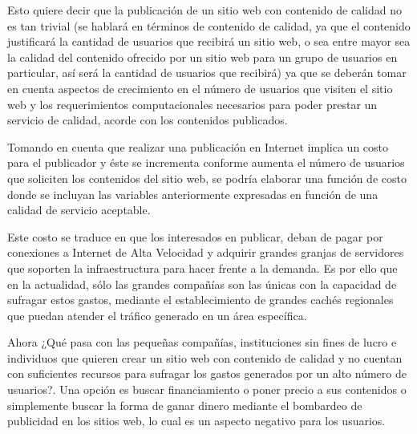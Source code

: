 Esto quiere decir que la publicación de un sitio web con contenido de calidad no es tan trivial (se hablará en términos de contenido de calidad, ya que el contenido justificará la cantidad de usuarios que recibirá un sitio web, o sea entre mayor sea la calidad del contenido ofrecido por un sitio web para un grupo de usuarios en particular, así será la cantidad de usuarios que recibirá) ya que se deberán tomar en cuenta aspectos de crecimiento en el número de usuarios que visiten el sitio web y los requerimientos computacionales necesarios para poder prestar un servicio de calidad, acorde con los contenidos publicados.

Tomando en cuenta que realizar una publicación en Internet implica un costo para el publicador y éste se incrementa conforme aumenta el número de usuarios que soliciten los contenidos del sitio web, se podría elaborar una función de costo donde se incluyan las variables anteriormente expresadas en función de una calidad de servicio aceptable.

Este costo se traduce en que los interesados en publicar, deban de pagar por conexiones a Internet de Alta Velocidad y adquirir grandes granjas de servidores que soporten la infraestructura para hacer frente a la demanda. Es por ello que en la actualidad, sólo las grandes compañías son las únicas con la capacidad de sufragar estos gastos, mediante el establecimiento de grandes cachés regionales que puedan atender el tráfico generado en un área específica.

Ahora ¿Qué pasa con las pequeñas compañías, instituciones sin fines de lucro e individuos que quieren crear un sitio web con contenido de calidad y no cuentan con suficientes recursos para sufragar los gastos generados por un alto número de usuarios?. Una opción es buscar financiamiento o poner precio a sus contenidos o simplemente buscar la forma de ganar dinero mediante el bombardeo de publicidad en los sitios web, lo cual es un aspecto negativo para los usuarios.

